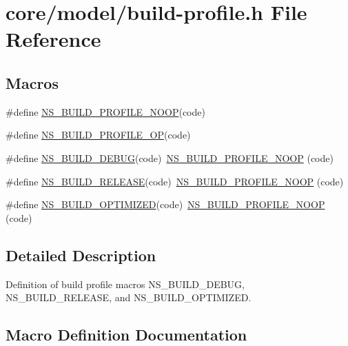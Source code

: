 \hypertarget{build-profile_8h}{}\section{core/model/build-\/profile.h File Reference}
\label{build-profile_8h}
\subsection*{Macros}
\begin{DoxyCompactItemize}
\item 
\#define \hyperlink{build-profile_8h_ab56acc68c232826be17c0f84d059cc8c}{N\+S\+\_\+\+B\+U\+I\+L\+D\+\_\+\+P\+R\+O\+F\+I\+L\+E\+\_\+\+N\+O\+OP}(code)
\item 
\#define \hyperlink{build-profile_8h_a574fdae1cda910b66e6f6d5b56de802c}{N\+S\+\_\+\+B\+U\+I\+L\+D\+\_\+\+P\+R\+O\+F\+I\+L\+E\+\_\+\+OP}(code)
\item 
\#define \hyperlink{build-profile_8h_a8f46d39331904495b189a130c099c029}{N\+S\+\_\+\+B\+U\+I\+L\+D\+\_\+\+D\+E\+B\+UG}(code)~\hyperlink{build-profile_8h_ab56acc68c232826be17c0f84d059cc8c}{N\+S\+\_\+\+B\+U\+I\+L\+D\+\_\+\+P\+R\+O\+F\+I\+L\+E\+\_\+\+N\+O\+OP} (code)
\item 
\#define \hyperlink{build-profile_8h_a5e1343bd6d1905d8222e62a901b96525}{N\+S\+\_\+\+B\+U\+I\+L\+D\+\_\+\+R\+E\+L\+E\+A\+SE}(code)~\hyperlink{build-profile_8h_ab56acc68c232826be17c0f84d059cc8c}{N\+S\+\_\+\+B\+U\+I\+L\+D\+\_\+\+P\+R\+O\+F\+I\+L\+E\+\_\+\+N\+O\+OP} (code)
\item 
\#define \hyperlink{build-profile_8h_a18649505b0d3317cfbb1cdc18c757d96}{N\+S\+\_\+\+B\+U\+I\+L\+D\+\_\+\+O\+P\+T\+I\+M\+I\+Z\+ED}(code)~\hyperlink{build-profile_8h_ab56acc68c232826be17c0f84d059cc8c}{N\+S\+\_\+\+B\+U\+I\+L\+D\+\_\+\+P\+R\+O\+F\+I\+L\+E\+\_\+\+N\+O\+OP} (code)
\end{DoxyCompactItemize}


\subsection{Detailed Description}
Definition of build profile macros N\+S\+\_\+\+B\+U\+I\+L\+D\+\_\+\+D\+E\+B\+UG, N\+S\+\_\+\+B\+U\+I\+L\+D\+\_\+\+R\+E\+L\+E\+A\+SE, and N\+S\+\_\+\+B\+U\+I\+L\+D\+\_\+\+O\+P\+T\+I\+M\+I\+Z\+ED. 

\subsection{Macro Definition Documentation}
